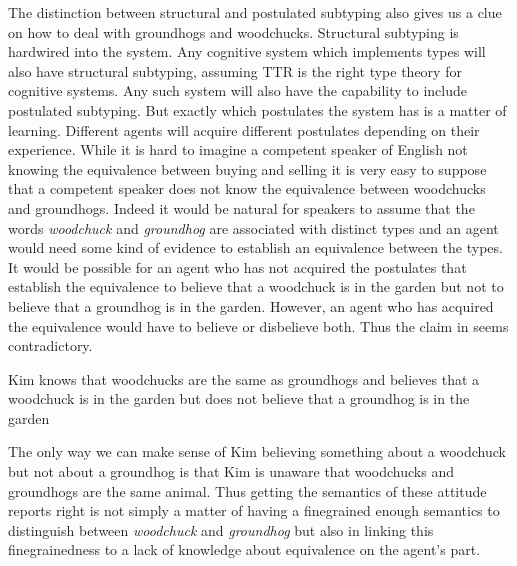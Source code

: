 The distinction between structural and postulated subtyping also gives
us a clue on how to deal with groundhogs and woodchucks.  Structural
subtyping is hardwired into the system.  Any cognitive system which
implements types will also have structural subtyping, assuming TTR is
the right type theory for cognitive systems.  Any such system will
also have the capability to include postulated subtyping.  But exactly
which postulates the system has is a matter of learning.  Different
agents will acquire different postulates depending on their
experience.  While it is hard to imagine a competent speaker of
English not knowing the equivalence between buying and selling it is
very easy to suppose that a competent speaker does not know the
equivalence between woodchucks and groundhogs.  Indeed it would be
natural for speakers to assume that the words \textit{woodchuck} and
\textit{groundhog} are associated with distinct types and an agent
would need some kind of evidence to establish an equivalence between
the types.  It would be possible for an agent who has not acquired the postulates that
establish the equivalence to believe that a woodchuck is in the
garden but not to believe that a groundhog is in the garden.  However,
an agent who has acquired the equivalence would have to believe or
disbelieve both.  Thus the claim in \nexteg{} seems contradictory.
\begin{ex} 
Kim knows that woodchucks are the same as groundhogs and believes that
a woodchuck is in the garden but does not believe that a groundhog is
in the garden 
\end{ex} 
The only way we can make sense of Kim believing something about a
woodchuck but not about a groundhog is that Kim is unaware that
woodchucks and groundhogs are the same animal.  Thus getting the
semantics of these attitude reports right is not simply a matter of
having a finegrained enough semantics to distinguish between
\textit{woodchuck} and \textit{groundhog} but also in linking this
finegrainedness to a lack of knowledge about equivalence on the
agent's part.   

